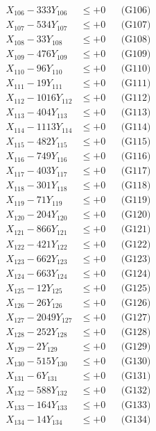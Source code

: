 \documentclass[a4paper,10pt]{article}
\begin{document}
{\begin{align}
X_{106} - 333Y_{106} &\leq +0 && \text{(G106)} \\
X_{107} - 534Y_{107} &\leq +0 && \text{(G107)} \\
X_{108} - 33Y_{108} &\leq +0 && \text{(G108)} \\
X_{109} - 476Y_{109} &\leq +0 && \text{(G109)} \\
X_{110} - 96Y_{110} &\leq +0 && \text{(G110)} \\
\allowbreak
X_{111} - 19Y_{111} &\leq +0 && \text{(G111)} \\
X_{112} - 1016Y_{112} &\leq +0 && \text{(G112)} \\
X_{113} - 404Y_{113} &\leq +0 && \text{(G113)} \\
X_{114} - 1113Y_{114} &\leq +0 && \text{(G114)} \\
X_{115} - 482Y_{115} &\leq +0 && \text{(G115)} \\
X_{116} - 749Y_{116} &\leq +0 && \text{(G116)} \\
X_{117} - 403Y_{117} &\leq +0 && \text{(G117)} \\
X_{118} - 301Y_{118} &\leq +0 && \text{(G118)} \\
X_{119} - 71Y_{119} &\leq +0 && \text{(G119)} \\
X_{120} - 204Y_{120} &\leq +0 && \text{(G120)} \\
\allowbreak
X_{121} - 866Y_{121} &\leq +0 && \text{(G121)} \\
X_{122} - 421Y_{122} &\leq +0 && \text{(G122)} \\
X_{123} - 662Y_{123} &\leq +0 && \text{(G123)} \\
X_{124} - 663Y_{124} &\leq +0 && \text{(G124)} \\
X_{125} - 12Y_{125} &\leq +0 && \text{(G125)} \\
X_{126} - 26Y_{126} &\leq +0 && \text{(G126)} \\
X_{127} - 2049Y_{127} &\leq +0 && \text{(G127)} \\
X_{128} - 252Y_{128} &\leq +0 && \text{(G128)} \\
X_{129} - 2Y_{129} &\leq +0 && \text{(G129)} \\
X_{130} - 515Y_{130} &\leq +0 && \text{(G130)} \\
\allowbreak
X_{131} - 6Y_{131} &\leq +0 && \text{(G131)} \\
X_{132} - 588Y_{132} &\leq +0 && \text{(G132)} \\
X_{133} - 164Y_{133} &\leq +0 && \text{(G133)} \\
X_{134} - 14Y_{134} &\leq +0 && \text{(G134)} \\

\end{align}}
\end{document}
